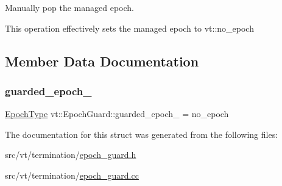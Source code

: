 Manually pop the managed epoch. 

This operation effectively sets the managed epoch to vt\+::no\+\_\+epoch 

\subsection{Member Data Documentation}
\mbox{\label{structvt_1_1_epoch_guard_aecd3303d5b5594b0f19791a472ce515c}} 
\subsubsection{\texorpdfstring{guarded\+\_\+epoch\+\_\+}{guarded\_epoch\_}}
{\footnotesize\ttfamily \hyperlink{namespacevt_a985a5adf291c34a3ca263b3378388236}{Epoch\+Type} vt\+::\+Epoch\+Guard\+::guarded\+\_\+epoch\+\_\+ = no\+\_\+epoch\hspace{0.3cm}{\ttfamily [private]}}



The documentation for this struct was generated from the following files\+:\begin{DoxyCompactItemize}
\item 
src/vt/termination/\hyperlink{epoch__guard_8h}{epoch\+\_\+guard.\+h}\item 
src/vt/termination/\hyperlink{epoch__guard_8cc}{epoch\+\_\+guard.\+cc}\end{DoxyCompactItemize}
